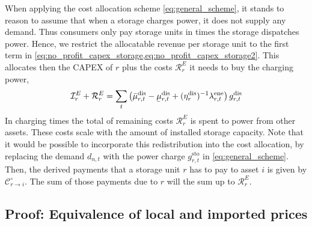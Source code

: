 \documentclass[11pt,twocolumn]{article}
\newcommand{\ubar}[1]{\underaccent{\bar}{#1}}
\newcommand{\storage}{g_{r,t}}
\newcommand{\storagedispatch}{\storage^\text{dis}}
\newcommand{\storagecharge}{\storage^\text{sto}}
\newcommand{\efficiency}{\eta_{r}}
\newcommand{\efficiencydispatch}{\efficiency^\text{dis}}
\newcommand{\mulowerstoragedispatch}{\ubar{\mu}_{r,t}^\text{dis}}
\newcommand{\muupperstoragedispatch}{\bar{\mu}_{r,t}^\text{dis}}
\newcommand{\mustateofcharge}{\lambda^\text{ene}_{r,t}}
\newcommand{\demand}[1][n]{d_{#1,t}}
\newcommand{\cost}[1][\circ]{\mathcal{C}^{#1}}
\newcommand{\capexstorage}{\mathcal{I}^E}
\newcommand{\remainingcost}{\mathcal{R}}
\begin{document}
When applying the cost allocation scheme \cref{eq:general_scheme}, it stands to reason to assume that when a storage charges power, it does not supply any demand. Thus consumers only pay storage units in times the storage dispatches power. Hence, we restrict the allocatable revenue per storage unit to the first term in \cref{eq:no_profit_capex_storage,eq:no_profit_capex_storage2}. This allocates then the CAPEX of $r$ plus the costs $\remainingcost^E_r$ it needs to buy the charging power, 
\begin{align}
        \capexstorage_r + \remainingcost^E_r = \sum_t \left(\muupperstoragedispatch - \mulowerstoragedispatch  + (\efficiencydispatch )^{-1} \mustateofcharge \right) \storagedispatch 
\end{align} 
In charging times the total of remaining costs $\remainingcost^E_r$ is spent to power from other assets. These costs scale with the amount of installed storage capacity.
Note that it would be possible to incorporate this redistribution into the cost allocation, by replacing the demand $\demand$ with the power charge $\storagecharge$ in \cref{eq:general_scheme}. Then, the derived payments that a storage unit $r$ has to pay to asset $i$ is given by $\cost_{r \rightarrow i}$. The sum of those payments due to $r$ will the sum up to $\remainingcost^E_r$. 



\subsection{Proof: Equivalence of local and imported prices}
\end{document}

